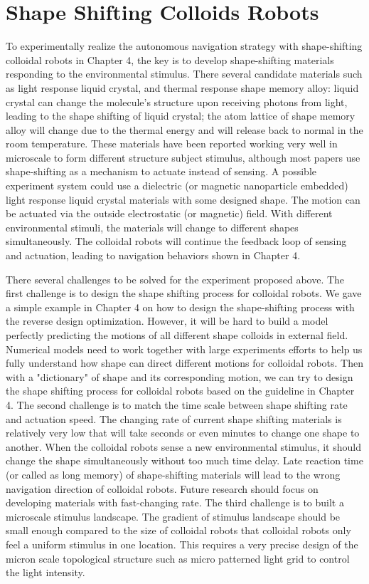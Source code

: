 \section{Shape Shifting Colloids Robots}
To experimentally realize the autonomous navigation strategy with shape-shifting colloidal robots in Chapter 4, the key is to develop shape-shifting materials responding to the environmental stimulus. There several candidate materials such as  light response liquid crystal\autocite{palagi2016structured}, and thermal response shape memory alloy\autocite{busch1991shape}: liquid crystal can change the molecule's structure upon receiving photons from  light, leading to the shape shifting of liquid crystal; the atom lattice of shape memory alloy will change due to the thermal energy and will release back to normal in the room temperature. These materials have been reported working very well in microscale to form different structure subject stimulus\autocite{breger2015self}, although most papers use shape-shifting as a mechanism to actuate instead of sensing\autocite{tu2017self,li2018light}. A possible experiment system could use a dielectric (or magnetic nanoparticle embedded) light response liquid crystal materials with some designed shape.   The motion can be actuated via the outside electrostatic (or magnetic) field. With different environmental stimuli, the materials will change to different shapes simultaneously. The colloidal robots will continue the feedback loop of sensing and actuation, leading to navigation behaviors shown in Chapter 4. 

There several challenges to be solved for the experiment proposed above. The first challenge  is to design the shape shifting process for colloidal robots. We gave a simple example in Chapter 4 on how to design the shape-shifting process with the reverse design optimization. However, it will be hard to build a model perfectly predicting the motions of all different shape colloids in external field. Numerical models need to work together with large experiments efforts to help us fully understand how shape can direct different motions for colloidal robots\autocite{lee2019directed}. Then with a "dictionary" of shape and its corresponding motion, we can try to design the shape shifting process for colloidal robots based on the guideline in Chapter 4. The second challenge is to match the time scale between shape shifting rate and actuation speed. The changing rate of current shape shifting materials is relatively very low that will take seconds or even minutes to change one shape to another. When the colloidal robots sense a new environmental stimulus, it should change the shape simultaneously without too  much time delay. Late reaction time (or called as long memory) of shape-shifting materials will  lead to the wrong navigation direction of colloidal robots. Future research should focus on developing materials with fast-changing rate. The third challenge is to built a microscale stimulus landscape. The gradient of stimulus landscape should be small enough compared to the size of colloidal robots that colloidal robots only feel a uniform stimulus in one location. This requires a very precise  design of the micron scale topological structure such as micro patterned light grid to control the light intensity. 

